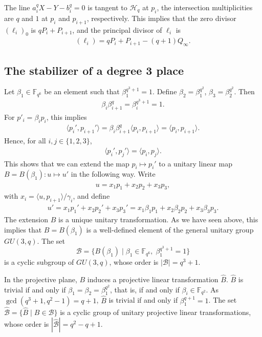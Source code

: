 \documentclass[a4paper]{amsart}
\theoremstyle{plain}
\theoremstyle{definition}
\theoremstyle{remark}
\begin{document}
The line $a_i^qX-Y-b_i^q=0$ is tangent to $\mathscr{H}_q$ at $p_i$, the intersection multiplicities are $q$ and $1$ at $p_i$ and $p_{i+1}$, respectively. This implies that the zero divisor $(\ell_i)_0$ is $qP_i+P_{i+1}$, and the principal divisor of $\ell_i$ is
\begin{align} \label{eq:div-ell-i}
(\ell_i)=qP_i+P_{i+1}-(q+1)Q_\infty.
\end{align}



\subsection{The stabilizer of a degree 3 place}
Let $\beta_1\in \mathbb{F}_{q^6}$ be an element such that $\beta_1^{q^3+1}=1$. Define $\beta_2=\beta_1^{q^2}$, $\beta_3=\beta_2^{q^2}$. Then 
\begin{align*} %
\beta_i\beta_{i+1}^q=\beta_i^{q^3+1}=1.
\end{align*}
For $p'_i=\beta_i p_i$, this implies
\begin{align*} %
\langle p_i',p_{i+1}' \rangle = \beta_i\beta_{i+1}^q \langle p_i,p_{i+1} \rangle = \langle p_i,p_{i+1} \rangle.
\end{align*}
Hence, for all $i,j\in \{1,2,3\}$, 
\begin{align*} %
\langle p_i',p_{j}' \rangle = \langle p_i,p_{j} \rangle.
\end{align*}
This shows that we can extend the map $p_i\mapsto p_i'$ to a unitary linear map $B=B(\beta_1):u\mapsto u'$ in the following way. Write
\begin{align*} %
u=x_1p_1+x_2p_2+x_3p_3,
\end{align*}
with $x_i=\langle u,p_{i+1} \rangle / \gamma_i$, and define
\begin{align} \label{eq:Bdef}
u'=x_1p_1'+x_2p_2'+x_3p_3' = x_1\beta_1 p_1+x_2\beta_2p_2+x_3\beta_3p_3.
\end{align}
The extension $B$ is a unique unitary transformation. As we have seen above, this implies that $B=B(\beta_1)$ is a well-defined element of the general unitary group $GU(3,q)$. The set 
\[\mathcal{B}=\{B(\beta_1) \mid \beta_1 \in \mathbb{F}_{q^6}, \; \beta_1^{q^3+1}=1\}\]
is a cyclic subgroup of $GU(3,q)$, whose order is $|\mathcal{B}|=q^3+1$. 

In the projective plane, $B$ induces a projective linear transformation $\hat{B}$. $\hat{B}$ is trivial if and only if $\beta_1=\beta_2=\beta_1^{q^2}$, that is, if and only if $\beta_i\in \mathbb{F}_{q^2}$. As $\gcd(q^3+1,q^2-1)=q+1$, $\hat{B}$ is trivial if and only if $\beta_1^{q+1}=1$. The set $\hat{\mathcal{B}} = \{\hat{B} \mid B\in \mathcal{B}\}$ is a cyclic group of unitary projective linear transformations, whose order is $|\hat{\mathcal{B}}|=q^2-q+1$. 
\end{document}
